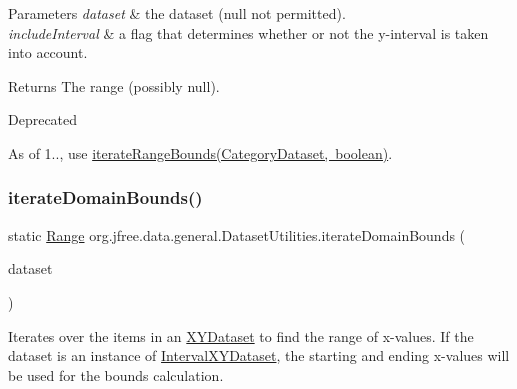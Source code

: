 \begin{DoxyParams}{Parameters}
{\em dataset} & the dataset ({\ttfamily null} not permitted). \\
\hline
{\em include\+Interval} & a flag that determines whether or not the y-\/interval is taken into account.\\
\hline
\end{DoxyParams}
\begin{DoxyReturn}{Returns}
The range (possibly {\ttfamily null}).
\end{DoxyReturn}
\begin{DoxyRefDesc}{Deprecated}
\item[\mbox{\hyperlink{deprecated__deprecated000260}{Deprecated}}]As of 1.., use \mbox{\hyperlink{classorg_1_1jfree_1_1data_1_1general_1_1_dataset_utilities_ae5aa72f93c4a25f52025f5d0288de9a9}{iterate\+Range\+Bounds(\+Category\+Dataset, boolean)}}. \end{DoxyRefDesc}
\mbox{\label{classorg_1_1jfree_1_1data_1_1general_1_1_dataset_utilities_a6b1bcd84440a9f1b9b2af473f91aae40}} 
\subsubsection{\texorpdfstring{iterate\+Domain\+Bounds()}{iterateDomainBounds()}\hspace{0.1cm}{\footnotesize\ttfamily [1/2]}}
{\footnotesize\ttfamily static \mbox{\hyperlink{classorg_1_1jfree_1_1data_1_1_range}{Range}} org.\+jfree.\+data.\+general.\+Dataset\+Utilities.\+iterate\+Domain\+Bounds (\begin{DoxyParamCaption}\item[{\mbox{\hyperlink{interfaceorg_1_1jfree_1_1data_1_1xy_1_1_x_y_dataset}{X\+Y\+Dataset}}}]{dataset }\end{DoxyParamCaption})\hspace{0.3cm}{\ttfamily [static]}}

Iterates over the items in an \mbox{\hyperlink{}{X\+Y\+Dataset}} to find the range of x-\/values. If the dataset is an instance of \mbox{\hyperlink{}{Interval\+X\+Y\+Dataset}}, the starting and ending x-\/values will be used for the bounds calculation.


